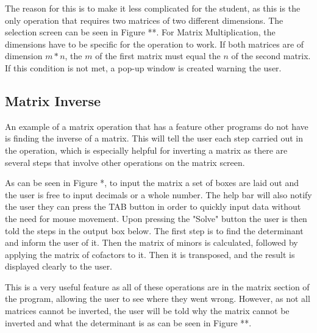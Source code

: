 \documentclass[final]{cmpreport}
\begin{document}
	The reason for this is to make it less complicated for the student, as this is the only operation that requires two matrices of two different dimensions. The selection screen can be seen in Figure **. For Matrix Multiplication, the dimensions have to be specific for the operation to work. If both matrices are of dimension $m * n$, the $m$ of the first matrix must equal the $n$ of the second matrix. If this condition is not met, a pop-up window is created warning the user.
	
	\subsection{Matrix Inverse} \label{sec:inv}
	
	An example of a matrix operation that has a feature other programs do not have is finding the inverse of a matrix. This will tell the user each step carried out in the operation, which is especially helpful for inverting a matrix as there are several steps that involve other operations on the matrix screen.
	
	As can be seen in Figure *, to input the matrix a set of boxes are laid out and the user is free to input decimals or a whole number. The help bar will also notify the user they can press the TAB button in order to quickly input data without the need for mouse movement. Upon pressing the "Solve" button the user is then told the steps in the output box below. The first step is to find the determinant and inform the user of it. Then the matrix of minors is calculated, followed by applying the matrix of cofactors to it. Then it is transposed, and the result is displayed clearly to the user.
	
	This is a very useful feature as all of these operations are in the matrix section of the program, allowing the user to see where they went wrong. However, as not all matrices cannot be inverted, the user will be told why the matrix cannot be inverted and what the determinant is as can be seen in Figure **.
	
	
	
	
\end{document}
